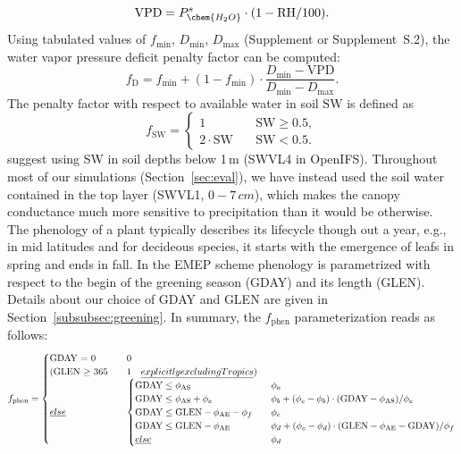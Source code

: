 \documentclass[gmd, manuscript]{copernicus}
\begin{document}
%
\begin{equation}
  \text{VPD} = P_\chem{H_2O}^s \cdot (1 - \text{RH}/100).
\end{equation}
%
Using tabulated values of $f_\text{min}$, $D_\text{min}$, $D_\text{max}$ (Supplement \citet{ACP:Simpson2012} or Supplement~S.2), the water vapor pressure deficit penalty factor can be computed:
%
\begin{equation}
  f_\text{D} = f_\text{min}+(1-f_\text{min}) \cdot \frac{D_\text{min} - \text{VPD}}{D_\text{min}-D_\text{max}}.
\end{equation}
%
The penalty factor with respect to available water in soil $\text{SW}$ is defined as 
%
\begin{equation}
  f_\text{SW} =
  \begin{cases}
    1 & \quad \text{SW} \geq 0.5,\\
    2 \cdot \text{SW}  & \quad \text{SW} < 0.5.
  \end{cases}
\end{equation}
\citet{ACP:Simpson2012} suggest using SW in soil depths below 1\,\unit{m} (SWVL4 in OpenIFS). Throughout most of our simulations (Section~\ref{sec:eval}), we have instead used the soil water contained in the top layer (SWVL1, $0-7\,\unit{cm}$), which makes the canopy conductance much more sensitive to precipitation than it would be otherwise. The phenology of a plant typically describes its lifecycle though out a year, e.g., in mid latitudes and for decideous species, it starts with the emergence of leafs in spring and ends in fall. In the EMEP scheme phenology is parametrized with respect to the begin of the greening season (GDAY) and its length (GLEN). Details about our choice of GDAY and GLEN are given in Section~\ref{subsubsec:greening}. In summary, the $f_\text{phen}$ parameterization reads as follows:
%
\begin{equation}
  f_\text{phen} =
  \begin{cases}
    \text{GDAY = 0}  & \quad 0 \\
    \text{(GLEN $\ge$ 365} & \quad 1 \quad \emph{explicitly excluding Tropics}) \\
    \emph{else}  & \quad 
    \begin{cases}
      \text{GDAY} \le \phi_\text{AS}  & \quad \phi_a \\
      \text{GDAY} \le \phi_\text{AS} + \phi_e  & \quad \phi_b+(\phi_c-\phi_b)\cdot(\text{GDAY}-\phi_\text{AS})/\phi_e\\
      \text{GDAY} \le \text{GLEN} - \phi_\text{AE} - \phi_f  & \quad \phi_c\\
      \text{GDAY} \le \text{GLEN} - \phi_\text{AE}  & \quad \phi_d+(\phi_c-\phi_d)\cdot(\text{GLEN}-\phi_\text{AE}-\text{GDAY})/\phi_f\\
      \emph{else} & \quad \phi_d
    \end{cases}
  \end{cases}
\end{equation}
\end{document}
